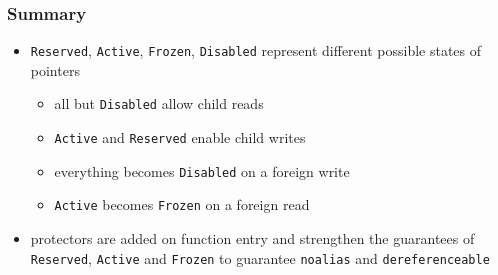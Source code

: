 
\begin{frame}
    \frametitle{Summary}
    \begin{itemize}
        \item \texttt{Reserved}, \texttt{Active}, \texttt{Frozen}, \texttt{Disabled}
            represent different possible states of pointers
            \begin{itemize}
                \item all but \texttt{Disabled} allow child reads
                \item \texttt{Active} and \texttt{Reserved} enable child writes
                \item everything becomes \texttt{Disabled} on a foreign write
                \item \texttt{Active} becomes \texttt{Frozen} on a foreign read
            \end{itemize}
        \item protectors are added on function entry and strengthen the guarantees
            of \texttt{Reserved}, \texttt{Active} and \texttt{Frozen} to guarantee \texttt{noalias}
            and \texttt{dereferenceable}
    \end{itemize}
\end{frame}
